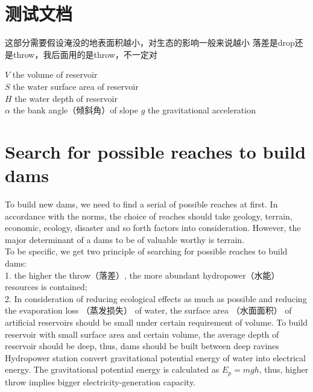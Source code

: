 \documentclass[nocover]{cumcmart}
\begin{document}
\section{测试文档}

这部分需要假设淹没的地表面积越小，对生态的影响一般来说越小
落差是drop还是throw，我后面用的是throw，不一定对

$V$ the volume of reservoir \\
$S$ the water surface area of reservoir \\
$H$ the water depth of reservoir \\
$\alpha$ the bank angle（倾斜角）of slope
$g$ the gravitational acceleration \\


\section{Search for possible reaches to build dams}
To build new dams, we need to find a serial of possible reaches at first. In accordance with the norms, the choice of reaches should take geology, terrain, economic, ecology, disaster and so forth factors into consideration. However, the major determinant of a dams to be of valuable worthy is terrain. \\
To be specific, we get two principle of searching for possible reaches to build dams:\\
1. the higher the throw（落差）, the more abundant hydropower（水能）resources is contained; \\
2. In consideration of reducing ecological effects as much as possible and reducing the evaporation loss （蒸发损失） of water, the surface area （水面面积） of artificial reservoirs should be small under certain requirement of volume. To build reservoir with small surface area and certain volume, the average depth of reservoir should be deep, thus, dams should be built between deep ravines\\

Hydropower station convert gravitational potential energy of water into electrical energy. The gravitational potential energy is calculated as $E_{p} = mgh$, thus, higher throw implies bigger electricity-generation capacity.
\end{document}
